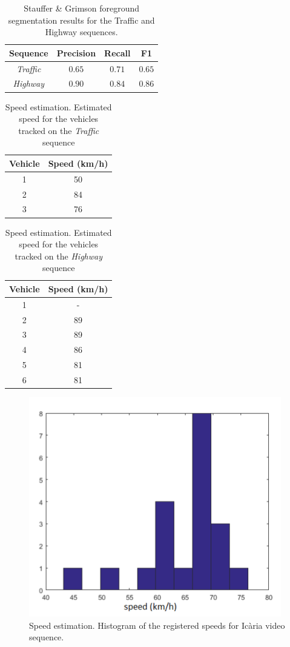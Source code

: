 \begin{table}[b]
\centering
\begin{tabular}{|c|c|c|c|}
\hline
Sequence & Precision & Recall & F1 \\
\hline
\textit{Traffic} & $0.65$ & $0.71$ & $0.65$ \\
\hline
\textit{Highway} & $0.90$ & $0.84$ & $0.86$ \\
\hline
\end{tabular}
\caption{Stauffer \& Grimson foreground segmentation results for the Traffic and Highway sequences.}
\label{tab:bg_measures}
\end{table}

\begin{table}[h]
\centering
\begin{tabular}{|c|c|}
\hline
Vehicle & Speed (km/h) \\
\hline
1 & 50   \\
\hline
2 &  84 \\
\hline
3 &  76 \\
\hline
\end{tabular}
\caption{Speed estimation. Estimated speed for the vehicles tracked on the \textit{Traffic} sequence}
\label{tab:traffic_speed}
\end{table}

\begin{table}[h]
\centering
\begin{tabular}{|c|c|}
\hline
Vehicle & Speed (km/h) \\
\hline
1 & -   \\
\hline
2 & 89 \\
\hline
3 & 89 \\
\hline
4 & 86 \\
\hline
5 & 81 \\
\hline
6 & 81 \\
\hline
\end{tabular}
\caption{Speed estimation. Estimated speed for the vehicles tracked on the \textit{Highway} sequence}
\label{tab:highway_speed}
\end{table}

\begin{figure}[h!]
\centering
\includegraphics[width=0.9\linewidth]{figures/hist_icaria.png} 
\caption{Speed estimation. Histogram of the registered speeds for Ic\`{a}ria video sequence.}
\label{fig:hist}
\end{figure}
